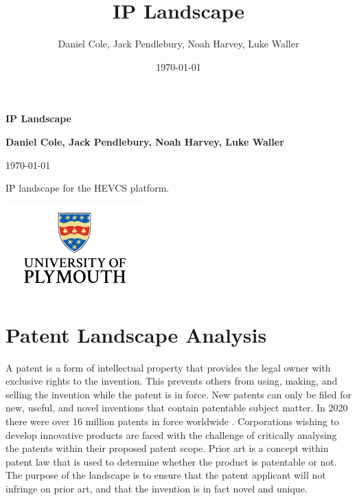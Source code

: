 \documentclass [12pt]{article}
\begin{document}
\title{\bf IP Landscape}
\author{Daniel Cole, Jack Pendlebury, Noah Harvey, Luke Waller}
\date{\today}

\begin{titlepage}
    \begin{center}
        \vspace*{1cm}

        {\Huge \textbf{IP Landscape}}

        \vspace{1.5cm}

        \textbf{Daniel Cole, Jack Pendlebury, Noah Harvey, Luke Waller}

        \today

        \vfill

        IP landscape for the HEVCS platform.

        \vspace{0.8cm}

        \includegraphics[width=0.4\textwidth]{UOP_Logo.png}

    \end{center}
\end{titlepage}

\newpage
{}
\setcounter{page}{1}
\tableofcontents
\newpage

\listoffigures
\listoftables

\newpage
\section{Patent Landscape Analysis}\label{sec:PLA}

A patent is a form of intellectual property that provides the legal owner with exclusive rights to the invention.
This prevents others from using, making, and selling the invention while the patent is in force.
New patents can only be filed for new, useful, and novel inventions that contain patentable subject matter.
In 2020 there were over 16 million patents in force worldwide \cite{WIPO_ref}.
Corporations wishing to develop innovative products are faced with the challenge of critically analysing the patents within their proposed patent scope.
Prior art is a concept within patent law that is used to determine whether the product is patentable or not.
The purpose of the landscape is to ensure that the patent applicant will not infringe on prior art, and that the invention is in fact novel and unique.
\end{document}
